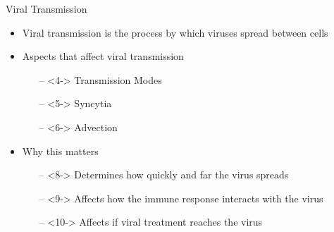 \documentclass{beamer}
\begin{document}
\begin{frame}{Viral Transmission}

    \begin{itemize}
        \item<2-> Viral transmission is the process by which viruses spread between cells 
    \end{itemize}

    \begin{itemize}    
        \item<3-> Aspects that affect viral transmission 
            \begin{itemize}
                \item[--]<4-> Transmission Modes
                \item[--]<5-> Syncytia
                \item[--]<6-> Advection
            \end{itemize}    
    \end{itemize}

    \begin{itemize}
        \item<7-> Why this matters
        \begin{itemize}
            \item[--]<8-> Determines how quickly and far the virus spreads
            \item[--]<9-> Affects how the immune response interacts with the virus 
            \item[--]<10-> Affects if viral treatment reaches the virus
        \end{itemize}
    \end{itemize}

\end{frame}
\end{document}
